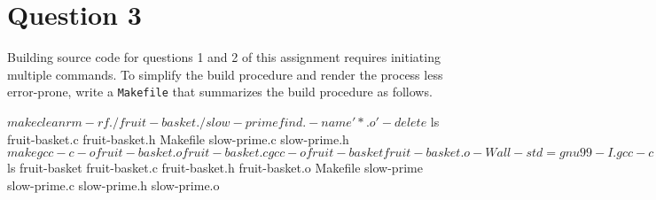 \documentclass[12pt,letterpaper,twoside]{article}
\begin{document}
\newpage

\section*{Question 3}

Building source code for questions 1 and 2 of this assignment requires initiating multiple commands.
To simplify the build procedure and render the process less error-prone, write a \texttt{Makefile} that summarizes the build procedure as follows.

\begin{terminal}
$ make clean
rm -rf ./fruit-basket ./slow-prime
find . -name '*.o' -delete
$ ls
fruit-basket.c fruit-basket.h Makefile slow-prime.c
slow-prime.h
$ make
gcc -c -o fruit-basket.o fruit-basket.c
gcc -o fruit-basket fruit-basket.o -Wall -std=gnu99 -I.
gcc -c -o slow-prime.o slow-prime.c
gcc -o slow-prime slow-prime.o -Werror -Wall -std=gnu99 -I.
$ ls
fruit-basket fruit-basket.c fruit-basket.h fruit-basket.o
Makefile     slow-prime     slow-prime.c   slow-prime.h
slow-prime.o
\end{terminal}

\end{document}
